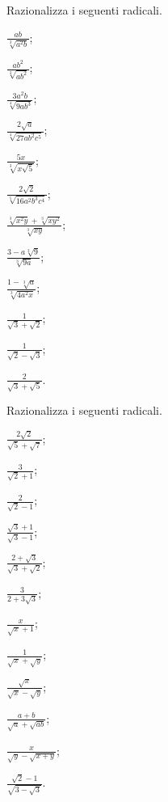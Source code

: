 \begin{esercizio}[\Ast]
 \label{ese:2.90}
Razionalizza i seguenti radicali.
 \begin{multicols}{4}
 \begin{enumeratea}
 \item $\frac{ab}{\sqrt[3]{a^2b}}$;
 \item $\frac{ab^2}{\sqrt[3]{ab^2}}$;
 \item $\frac{3a^2b}{\sqrt[4]{9ab^3}}$;
 \item $\frac{2\sqrt a}{\sqrt[4]{27ab^2c^5}}$;
 \item $\frac{5x}{\sqrt[3]{x\sqrt 5}}$;
 \item $\frac{2\sqrt 2}{\sqrt[5]{16a^2b^3c^4}}$;
 \item $\frac{\sqrt[3]{x^2y}+\sqrt[3]{xy^2}}{\sqrt[3]{xy}}$;
 \item $\frac{3-a\sqrt[3]9}{\sqrt[3]{9a}}$;
 \item $\frac{1-\sqrt[3]a}{\sqrt[3]{4a^2x}}$;
 \item $\frac 1{\sqrt 3+\sqrt 2}$;
 \item $\frac 1{\sqrt 2-\sqrt 3}$;
 \item $\frac 2{\sqrt 3+\sqrt 5}$.
 \end{enumeratea}
 \end{multicols}
\end{esercizio}

\begin{esercizio}[\Ast]
 \label{ese:2.91}
Razionalizza i seguenti radicali.
 \begin{multicols}{4}
 \begin{enumeratea}
 \item $\frac{2\sqrt 2}{\sqrt 5+\sqrt 7}$;
 \item $\frac 3{\sqrt 2+1}$;
 \item $\frac 2{\sqrt 2-1}$;
 \item $\frac{\sqrt 3+1}{\sqrt 3-1}$;
 \item $\frac{2+\sqrt 3}{\sqrt 3+\sqrt 2}$;
 \item $\frac 3{2+3\sqrt 3}$;
 \item $\frac x{\sqrt x+1}$;
 \item $\frac 1{\sqrt x+\sqrt y}$;
 \item $\frac{\sqrt x}{\sqrt x-\sqrt y}$;
 \item $\frac{a+b}{\sqrt a+\sqrt{ab}}$;
 \item $\frac x{\sqrt y-\sqrt{x+y}}$;
 \item $\frac{\sqrt 2-1}{\sqrt{3-\sqrt 3}}$.
 \end{enumeratea}
 \end{multicols}
\end{esercizio}


